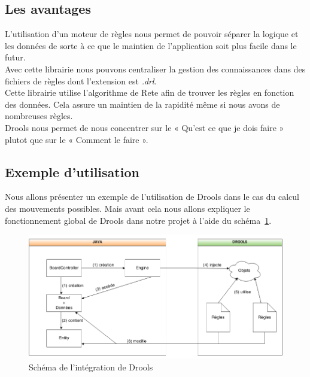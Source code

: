 		\subsection{Les avantages}
			L'utilisation d'un moteur de règles nous permet de pouvoir séparer la logique et les données de sorte à ce que le maintien de l'application soit plus facile dans le futur.
			\\
			Avec cette librairie nous pouvons centraliser la gestion des connaissances dans des fichiers de règles dont l'extension est {\itshape .drl}.
			\\
			Cette librairie utilise l'algorithme de Rete afin de trouver les règles en fonction des données. Cela assure un maintien de la rapidité même si nous avons de nombreuses règles.
			\\
			Drools nous permet de nous concentrer sur le « Qu'est ce que je dois faire » plutot que sur le « Comment le faire ».


		\subsection{Exemple d'utilisation}

			Nous allons présenter un exemple de l'utilisation de Drools dans le cas du calcul des mouvements possibles. Mais avant cela nous allons expliquer le fonctionnement global de Drools dans notre projet à l'aide du schéma~\ref{fig:drools_global_utilisation}.		
			\begin{figure}[!h]
			    \caption{Schéma de l'intégration de Drools}
			    \centerline{\includegraphics[scale=0.6]{images/architecture/drools_schema_use.png}}
			    \label{fig:drools_global_utilisation}
			\end{figure} 

